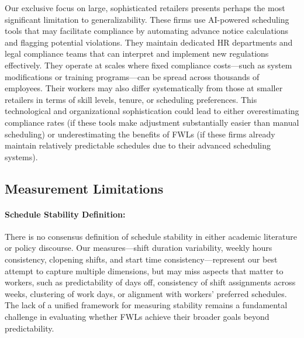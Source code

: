 \documentclass[letterpaper,11pt,leqno]{article}
\theoremstyle{paper}
\begin{document}
Our exclusive focus on large, sophisticated retailers presents perhaps the most significant limitation to generalizability. These firms use AI-powered scheduling tools that may facilitate compliance by automating advance notice calculations and flagging potential violations. They maintain dedicated HR departments and legal compliance teams that can interpret and implement new regulations effectively. They operate at scales where fixed compliance costs—such as system modifications or training programs—can be spread across thousands of employees. Their workers may also differ systematically from those at smaller retailers in terms of skill levels, tenure, or scheduling preferences. This technological and organizational sophistication could lead to either overestimating compliance rates (if these tools make adjustment substantially easier than manual scheduling) or underestimating the benefits of FWLs (if these firms already maintain relatively predictable schedules due to their advanced scheduling systems).

\subsection{Measurement Limitations}
\paragraph{Schedule Stability Definition:} There is no consensus definition of schedule stability in either academic literature or policy discourse. Our measures—shift duration variability, weekly hours consistency, clopening shifts, and start time consistency—represent our best attempt to capture multiple dimensions, but may miss aspects that matter to workers, such as predictability of days off, consistency of shift assignments across weeks, clustering of work days, or alignment with workers' preferred schedules. The lack of a unified framework for measuring stability remains a fundamental challenge in evaluating whether FWLs achieve their broader goals beyond predictability.
\end{document}
